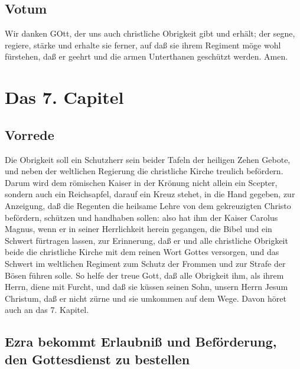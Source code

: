 \section{Votum}

Wir danken GOtt, der uns auch christliche Obrigkeit gibt und erhält; der segne, regiere, stärke und erhalte sie ferner, auf daß sie ihrem Regiment möge wohl fürstehen, daß er geehrt und die armen Unterthanen geschützt werden. Amen.

\chapter{Das 7. Capitel}

\section{Vorrede}

Die Obrigkeit soll ein Schutzherr sein beider Tafeln der heiligen Zehen Gebote, und neben der weltlichen Regierung die christliche Kirche treulich befördern. Darum wird dem römischen Kaiser in der Krönung nicht allein ein Scepter, sondern auch ein Reichsapfel, darauf ein Kreuz stehet, in die Hand gegeben, zur Anzeigung, daß die Regenten die heilsame Lehre von dem gekreuzigten Christo befördern, schützen und handhaben sollen: also hat ihm der Kaiser Carolus Magnus, wenn er in seiner Herrlichkeit herein gegangen, die Bibel und ein Schwert fürtragen lassen, zur Erinnerung, daß er und alle christliche Obrigkeit beide die christliche Kirche mit dem reinen Wort Gottes versorgen, und das Schwert im weltlichen Regiment zum Schutz der Frommen und zur Strafe der Bösen führen solle. So helfe der treue Gott, daß alle Obrigkeit ihm, als ihrem Herrn, diene mit Furcht, und daß sie küssen seinen Sohn, unsern Herrn Jesum Christum, daß er nicht zürne und sie umkommen auf dem Wege. Davon höret auch an das 7. Kapitel.

\section[Ezra bekommt Erlaubniß und Beförderung, den Gottesdienst zu]{Ezra bekommt Erlaubniß und Beförderung, den Gottesdienst zu bestellen}



